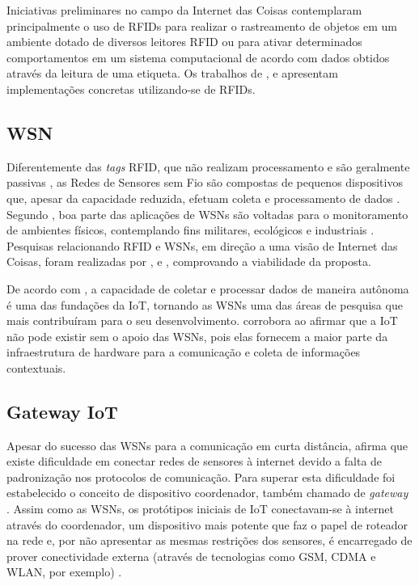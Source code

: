 \documentclass[twoside,english,brazilian]{UNISINOSmonografia}
\begin{document}
	Iniciativas preliminares no campo da Internet das Coisas contemplaram 
	principalmente o uso de RFIDs para realizar o rastreamento de objetos em 
	um ambiente dotado de diversos leitores RFID ou para ativar determinados 
	comportamentos em um sistema computacional de acordo com dados obtidos 
	através da leitura de uma etiqueta. Os trabalhos de , 
	 e  apresentam 
	implementações concretas utilizando-se de RFIDs.

\subsection{WSN}
	Diferentemente das \textit{tags} RFID, que não realizam processamento e 
	são geralmente passivas \cite{Atzori2010b}, as Redes de Sensores sem Fio 
	são compostas de pequenos dispositivos que, apesar da capacidade reduzida, 
	efetuam coleta e processamento de dados \cite{Sakthidharan2012}. Segundo 
	, boa parte das aplicações de WSNs são voltadas para 
	o monitoramento de ambientes físicos, contemplando fins militares, 
	ecológicos e industriais \cite{Suhonen2012}. Pesquisas relacionando RFID e 
	WSNs, em direção a uma visão de Internet das Coisas, foram realizadas por 
	,  e , 
	comprovando a viabilidade da proposta.
	
	De acordo com , a capacidade de coletar e processar 
	dados de maneira autônoma é uma das fundações da IoT, tornando as WSNs uma 
	das áreas de pesquisa que mais contribuíram para o seu desenvolvimento. 
	 corrobora ao afirmar que a IoT não pode existir sem 
	o apoio das WSNs, pois elas fornecem a maior parte da infraestrutura de 
	hardware para a comunicação e coleta de informações contextuais.

\subsection{Gateway IoT}
	Apesar do sucesso das WSNs para a comunicação em curta distância, 
	 afirma que existe dificuldade 
	em conectar redes de sensores à internet devido a falta de padronização 
	nos protocolos de comunicação. Para superar esta dificuldade foi 
	estabelecido o conceito de dispositivo coordenador, também chamado de 
	\textit{gateway} \cite{Steenkamp2009}. 
	Assim como as WSNs, os protótipos iniciais de IoT conectavam-se à internet 
	através do coordenador, um dispositivo mais potente que faz o papel de 
	roteador na rede \cite{Kuryla2010} e, por não apresentar as mesmas 
	restrições dos sensores, é encarregado de prover 
	conectividade externa (através de 
	tecnologias como GSM, CDMA e WLAN, por exemplo) \cite{Liu2012}.
	
\end{document}
